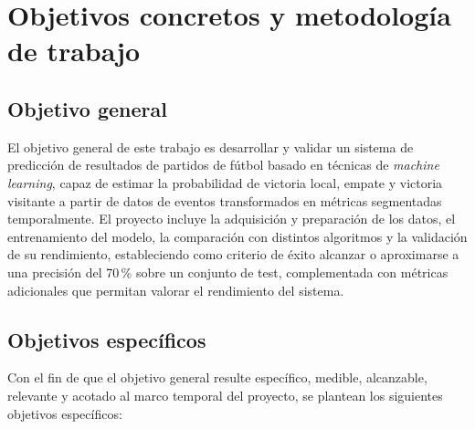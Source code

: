 \chapter{Objetivos concretos y metodología de trabajo}
\section{Objetivo general}
El objetivo general de este trabajo es desarrollar y validar un sistema de predicción de resultados de partidos de fútbol basado en técnicas de \textit{machine learning}, capaz de estimar la probabilidad de victoria local, empate y victoria visitante a partir de datos de eventos transformados en métricas segmentadas temporalmente. El proyecto incluye la adquisición y preparación de los datos, el entrenamiento del modelo, la comparación con distintos algoritmos y la validación de su rendimiento, estableciendo como criterio de éxito alcanzar o aproximarse a una precisión del 70\,\% sobre un conjunto de test, complementada con métricas adicionales que permitan valorar el rendimiento del sistema.

\section{Objetivos específicos}
Con el fin de que el objetivo general resulte específico, medible, alcanzable, relevante y acotado al marco temporal del proyecto, se plantean los siguientes objetivos específicos:

